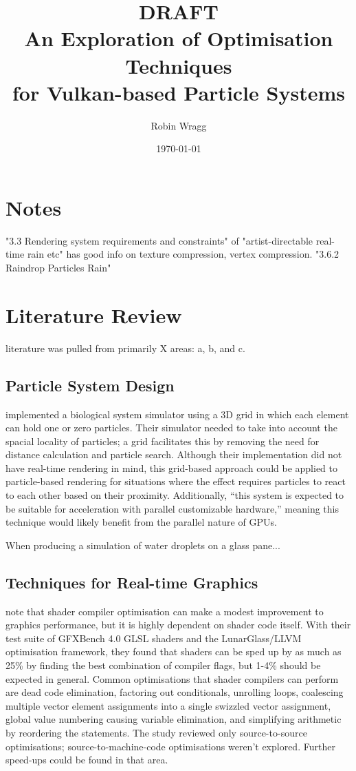 \documentclass[11pt, a4paper, twocolumn]{article}
\title{\sffamily\bfseries DRAFT\\An Exploration of Optimisation Techniques\\for Vulkan-based Particle Systems}
\author{Robin Wragg}
\date{\today}
\begin{document}
\maketitle

\section{Notes}
"3.3 Rendering system requirements and constraints" of "artist-directable real-time rain etc" has good info on texture compression, vertex compression.
"3.6.2 Raindrop Particles Rain"

\section{Literature Review}

literature was pulled from primarily X areas: a, b, and c.

\subsection{Particle System Design}

\citet{Boulianne2007} implemented a biological system simulator using a 3D grid in which each element can hold one or zero particles. Their simulator needed to take into account the spacial locality of particles; a grid facilitates this by removing the need for distance calculation and particle search. Although their implementation did not have real-time rendering in mind, this grid-based approach could be applied to particle-based rendering for situations where the effect requires particles to react to each other based on their proximity. Additionally, ``this system is expected to be suitable for acceleration with parallel customizable hardware,'' \citep{Boulianne2007} meaning this technique would likely benefit from the parallel nature of GPUs.

When producing a simulation of water droplets on a glass pane... \citet{Chen2012}

\subsection{Techniques for Real-time Graphics}

\citet{Crawford2018} note that shader compiler optimisation can make a modest improvement to graphics performance, but it is highly dependent on shader code itself. With their test suite of GFXBench 4.0 GLSL shaders and the LunarGlass/LLVM optimisation framework, they found that shaders can be sped up by as much as 25\% by finding the best combination of compiler flags, but 1-4\% should be expected in general. Common optimisations that shader compilers can perform are dead code elimination, factoring out conditionals, unrolling loops, coalescing multiple vector element assignments into a single swizzled vector assignment, global value numbering causing variable elimination, and simplifying arithmetic by reordering the statements. The study reviewed only source-to-source optimisations; source-to-machine-code optimisations weren't explored. Further speed-ups could be found in that area.
\end{document}
